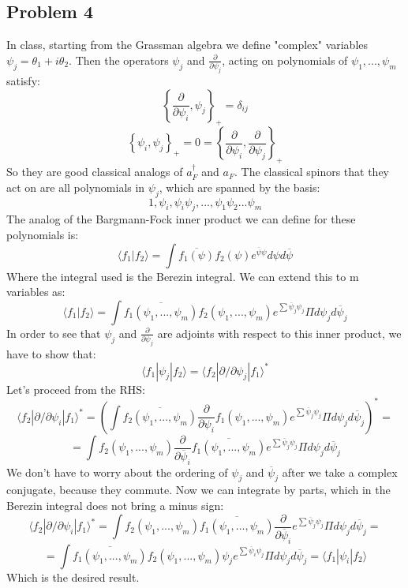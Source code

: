 \documentclass[12 pt]{article}
\begin{document}
\subsection*{Problem 4}
In class, starting from the Grassman algebra we define "complex" variables $\psi_j = \theta_1 + i \theta_2$. Then the operators $\psi_j$ and $\frac{\partial}{\partial \psi_j}$, acting on polynomials of $\psi_1, ... , \psi_m$ satisfy:
\[    \left\{  \frac{\partial}{\partial \psi_i} , \psi_j   \right\}_{+}  = \delta_{ij}  \]
\[    \left\{  \psi_i , \psi_j   \right\}_{+}  = 0 =    \left\{  \frac{\partial}{\partial \psi_i} , \frac{\partial}{\partial \psi_j}  \right\}_{+}   \]
So they are good classical analogs of $a_F^{\dagger}$ and $a_F$. The classical spinors that they act on are all polynomials in $\psi_j$, which are spanned by the basis:
\[   1  , \psi_i , \psi_i \psi_j , ... , \psi_1\psi_2...\psi_m  \]
The analog of the Bargmann-Fock inner product we can define for these polynomials is:
\[   \langle f_1|f_2\rangle = \int \overline{f_1(\psi)} f_2(\psi) e^{\overline \psi \psi} d\psi d\overline\psi    \]
Where the integral used is the Berezin integral. We can extend this to m variables as:
\[     \langle f_1|f_2\rangle = \int \overline{f_1(\psi_1, ... , \psi_m)} f_2(\psi_1, ... , \psi_m) e^{\sum \overline \psi_j \psi_j} \Pi d\psi_j d\overline\psi_j    \]
In order to see that $\psi_j$ and $\frac{\partial}{\partial \psi_j}$ are adjoints with respect to this inner product, we have to show that:
\[       \langle f_1 | \psi_j | f_2 \rangle = \langle f_2 |  \partial /\partial \psi_j |f_1 \rangle^*      \]
Let's proceed from the RHS:
\[   \langle f_2 |  \partial /\partial \psi_i |f_1 \rangle^* = \left( \int \overline{f_2(\psi_1, ... , \psi_m)} \frac{\partial}{\partial \psi_i}  f_1(\psi_1, ... , \psi_m) e^{\sum \overline \psi_j \psi_j} \Pi d\psi_j d\overline\psi_j \right)^* = \]
\[ =   \int {f_2(\psi_1, ... , \psi_m)} \frac{\partial}{\partial \overline \psi_i}  \overline{ f_1(\psi_1, ... , \psi_m)} e^{\sum \overline \psi_j \psi_j} \Pi d\psi_j d\overline\psi_j       \]
We don't have to worry about the ordering of $\psi_j$ and $\overline \psi_j$ after we take a complex conjugate, because they commute. Now we can integrate by parts, which in the Berezin integral does not bring a minus sign:
\[    \langle f_2 |  \partial /\partial \psi_i |f_1 \rangle^* =   \int {f_2(\psi_1, ... , \psi_m)}  \overline{ f_1(\psi_1, ... , \psi_m)} \frac{\partial}{\partial \overline \psi_i} e^{\sum \overline \psi_j \psi_j} \Pi d\psi_j d\overline\psi_j    =  \]
\[ =    \int \overline{f_1(\psi_1, ... , \psi_m)} f_2(\psi_1, ... , \psi_m) \psi_j e^{\sum \overline \psi_i \psi_j} \Pi d\psi_j d\overline\psi_j  = \langle f_1|\psi_i|f_2\rangle \]
Which is the desired result.
\end{document}
